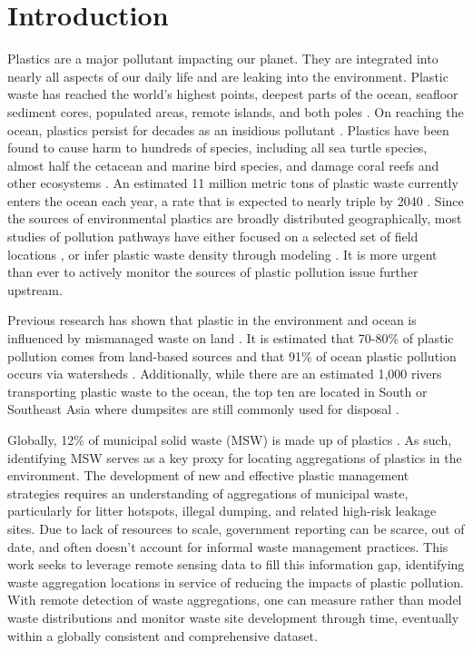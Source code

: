 \documentclass[10pt,letterpaper]{article}
\begin{document}
\linenumbers
\section*{Introduction}
Plastics are a major pollutant impacting our planet. They are integrated into nearly all aspects of our daily life and are leaking into the environment. Plastic waste has reached the world’s highest points, deepest parts of the ocean, seafloor sediment cores, populated areas, remote islands, and both poles \cite{napper2021abundance}\cite{chiba2018human}\cite{kelly2020microplastic}\cite{brandon2019multidecadal}\cite{lavers2020entrapment}\cite{browne2011accumulation}. On reaching the ocean, plastics persist for decades as an insidious pollutant \cite{lebreton2019global}\cite{worm2017plastic}. Plastics have been found to cause harm to hundreds of species, including all sea turtle species, almost half the cetacean and marine bird species, and damage coral reefs and other ecosystems \cite{harding2016marine}\cite{lamb2018plastic}\cite{beaumont2019global}. An estimated 11 million metric tons of plastic waste currently enters the ocean each year, a rate that is expected to nearly triple by 2040 \cite{lau2020evaluating}. Since the sources of environmental plastics are broadly distributed geographically, most studies of pollution pathways have either focused on a selected set of field locations \cite{jambeck2015plastic}, or infer plastic waste density through modeling \cite{lebreton2019future}\cite{SIEGFRIED2017249}. It is more urgent than ever to actively monitor the sources of plastic pollution issue further upstream.

Previous research has shown that plastic in the environment and ocean is influenced by mismanaged waste on land \cite{jambeck2015plastic}\cite{borrelle2020predicted}. It is estimated that 70-80\% of plastic pollution comes from land-based sources and that 91\% of ocean plastic pollution occurs via watersheds \cite{lebreton2019future}. Additionally, while there are an estimated 1,000 rivers transporting plastic waste to the ocean, the top ten are located in South or Southeast Asia where dumpsites are still commonly used for disposal \cite{meijer2021more}\cite{dhokhikah2012solid}\cite{kaza2018waste}. 

Globally, 12\% of municipal solid waste (MSW) is made up of plastics \cite{kaza2018waste}. As such, identifying MSW serves as a key proxy for locating aggregations of plastics in the environment. The development of new and effective plastic management strategies requires an understanding of aggregations of municipal waste, particularly for litter hotspots, illegal dumping, and related high-risk leakage sites. Due to lack of resources to scale, government reporting can be scarce, out of date, and often doesn’t account for informal waste management practices. This work seeks to leverage remote sensing data to fill this information gap, identifying waste aggregation locations in service of reducing the impacts of plastic pollution. With remote detection of waste aggregations, one can measure rather than model waste distributions and monitor waste site development through time, eventually within a globally consistent and comprehensive dataset.
\end{document}
